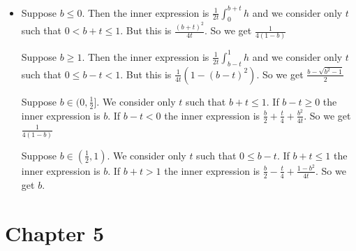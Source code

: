 \documentclass{article}
\begin{document}
\begin{itemize}
    \item[8] Suppose $b\leq0$. Then the inner expression is $\frac{1}{2t}\int_0^{b+t}h$ and we consider only $t$ such that $0<b+t\leq1$. But this is $\frac{(b+t)^2}{4t}$. So we get $\frac{1}{4(1-b)}$

    Suppose $b \geq 1$. Then the inner expression is $\frac{1}{2t}\int_{b-t}^1h$ and we consider only $t$ such that $0\leq b-t<1$. But this is $\frac{1}{4t}(1-(b-t)^2)$. So we get $\frac{b-\sqrt{b^2-1}}{2}$

    Suppose $b \in (0,\frac{1}{2}]$. We consider only $t$ such that $b+t \leq 1$. If $b-t \geq 0$ the inner expression is $b$. If $b-t<0$ the inner expression is $\frac{b}{2}+\frac{t}{4}+\frac{b^2}{4t}$. So we get $\frac{1}{4(1-b)}$

    Suppose $b\in(\frac{1}{2},1)$. We consider only $t$ such that $0\leq b-t$. If $b+t \leq1$ the inner expression is $b$. If $b+t>1$ the inner expression is $\frac{b}{2}-\frac{t}{4}+\frac{1-b^2}{4t}$. So we get $b$.

\end{itemize}

\section*{Chapter 5}
\end{document}
